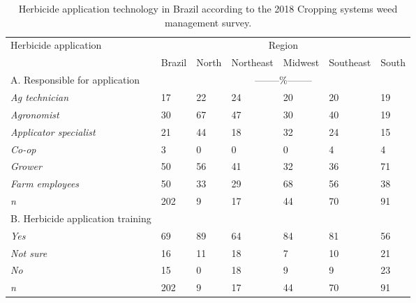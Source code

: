\documentclass[
  12pt,
  a4paper]{article}
\begin{document}
\newpage

\begin{table}[]
\centering
\caption{Herbicide application technology in Brazil according to the 2018 Cropping systems weed management survey.}
\label{tab:my-table}
\begin{tabular}{@{}lllllll@{}}
\toprule
\multirow{2}{*}{Herbicide application} & \multicolumn{6}{c}{Region}                               \\ \cmidrule(l){2-7} 
                                       & Brazil & North & Northeast & Midwest & Southeast & South \\ \midrule
A. Responsible for application         & \multicolumn{6}{c}{--------\%--------}                             \\
\hspace{3mm}\textit{Ag technician}                 & 17     & 22    & 24        & 20      & 20        & 19    \\
\hspace{3mm}\textit{Agronomist}                    & 30     & 67    & 47        & 30      & 40        & 19    \\
\hspace{3mm}\textit{Applicator specialist}         & 21     & 44    & 18        & 32      & 24        & 15    \\
\hspace{3mm}\textit{Co-op}                         & 3      & 0     & 0         & 0       & 4         & 4     \\
\hspace{3mm}\textit{Grower}                        & 50     & 56    & 41        & 32      & 36        & 71    \\
\hspace{3mm}\textit{Farm employees}                & 50     & 33    & 29        & 68      & 56        & 38    \\
\hspace{3mm}\textit{n}                             & 202    & 9     & 17        & 44      & 70        & 91    \\
B. Herbicide application training      &        &       &           &         &           &       \\
\hspace{3mm}\textit{Yes}                           & 69     & 89    & 64        & 84      & 81        & 56    \\
\hspace{3mm}\textit{Not sure}                      & 16     & 11    & 18        & 7       & 10        & 21    \\
\hspace{3mm}\textit{No}                            & 15     & 0     & 18        & 9       & 9         & 23    \\
\hspace{3mm}\textit{n}                             & 202    & 9     & 17        & 44      & 70        & 91    \\ \bottomrule
\end{tabular}
\end{table}
\end{document}
